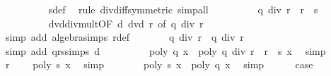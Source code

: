 \begin{isabellebody}
\ \ \ \ \ \ \ \ \isamarkupfalse%
\ s{\isacharprime}{\isacharunderscore}def\ \isamarkupfalse%
\ {\isacharparenleft}rule\ div{\isacharunderscore}diff{\isacharbrackleft}symmetric{\isacharbrackright}{\isacharcomma}\ simp{\isacharunderscore}all{\isacharparenright}\isanewline
\ \ \ \ \isamarkupfalse%
\ \isamarkupfalse%
\ {\isachardoublequoteopen}{\isachardot}{\isachardot}{\isachardot}\ {\isacharequal}\ q\ div\ r\ {\isacharasterisk}\ r{\isacharprime}\ {\isacharminus}\ s{\isacharprime}{\isachardoublequoteclose}\isanewline
\ \ \ \ \ \ \ \ \isamarkupfalse%
\ dvd{\isacharunderscore}div{\isacharunderscore}mult{\isacharbrackleft}OF\ {\isacharbackquoteopen}d\ dvd\ r{\isacharbackquoteclose}{\isacharcomma}\ of\ {\isachardoublequoteopen}q\ div\ r{\isachardoublequoteclose}{\isacharbrackright}\ \isanewline
\ \ \ \ \ \ \ \ \isamarkupfalse%
\ {\isacharparenleft}simp\ add{\isacharcolon}\ algebra{\isacharunderscore}simps\ r{\isacharprime}{\isacharunderscore}def{\isacharparenright}\isanewline
\ \ \ \ \isamarkupfalse%
\ \isamarkupfalse%
\ {\isachardoublequoteopen}q\ div\ r\ {\isacharequal}\ q{\isacharprime}\ div\ r{\isacharprime}{\isachardoublequoteclose}\ \isamarkupfalse%
\ {\isacharparenleft}simp\ add{\isacharcolon}\ qrs{\isacharunderscore}simps\ {\isacharbackquoteopen}d\ {\isasymnoteq}\ {}{\isacharbackquoteclose}{\isacharparenright}\isanewline
\ \ \ \ \isamarkupfalse%
\ \isamarkupfalse%
\ {\isachardoublequoteopen}poly\ q{\isacharprime}\ x\ {\isacharequal}\ poly\ {\isacharparenleft}q{\isacharprime}\ div\ r{\isacharprime}\ {\isacharasterisk}\ r{\isacharprime}\ {\isacharminus}\ s{\isacharprime}{\isacharparenright}\ x{\isachardoublequoteclose}\ \isamarkupfalse%
\ simp\isanewline
\ \ \ \ \isamarkupfalse%
\ \isamarkupfalse%
\ r{\isacharprime}{\isacharunderscore}{}\ \isamarkupfalse%
\ {\isachardoublequoteopen}{\isachardot}{\isachardot}{\isachardot}\ {\isacharequal}\ {\isacharminus}poly\ s{\isacharprime}\ x{\isachardoublequoteclose}\ \isamarkupfalse%
\ simp\isanewline
\ \ \ \ \isamarkupfalse%
\ \isamarkupfalse%
\ {\isachardoublequoteopen}poly\ s{\isacharprime}\ x\ {\isacharequal}\ {\isacharminus}poly\ q{\isacharprime}\ x{\isachardoublequoteclose}\ \isamarkupfalse%
\ simp\isanewline
\ \ \ \ \isamarkupfalse%
\ {\isacharquery}case\ \isamarkupfalse%

\end{isabellebody}
